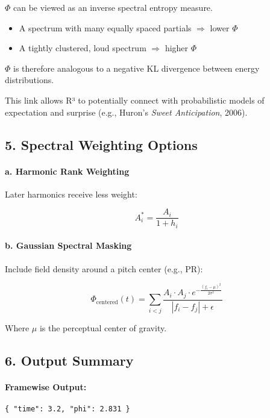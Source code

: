 \documentclass{article}
\begin{document}
$\Phi$ can be viewed as an inverse spectral entropy measure.

\begin{itemize}
    \item A spectrum with many equally spaced partials $\Rightarrow$ lower $\Phi$
    \item A tightly clustered, loud spectrum $\Rightarrow$ higher $\Phi$
\end{itemize}

$\Phi$ is therefore analogous to a negative KL divergence between energy distributions.

This link allows R³ to potentially connect with probabilistic models of expectation and surprise (e.g., Huron’s \textit{Sweet Anticipation}, 2006).

\subsection*{5. Spectral Weighting Options}

\paragraph{a. Harmonic Rank Weighting}

Later harmonics receive less weight:

\[
A_i^* = \frac{A_i}{1 + h_i}
\]

\paragraph{b. Gaussian Spectral Masking}

Include field density around a pitch center (e.g., PR):

\[
\Phi_{\text{centered}}(t) = \sum_{i<j} \frac{A_i \cdot A_j \cdot e^{-\frac{(f_i - \mu)^2}{2\sigma^2}}}{|f_i - f_j| + \epsilon}
\]

Where $\mu$ is the perceptual center of gravity.

\subsection*{6. Output Summary}

\paragraph{Framewise Output:}

\begin{verbatim}
{ "time": 3.2, "phi": 2.831 }
\end{verbatim}
\end{document}

